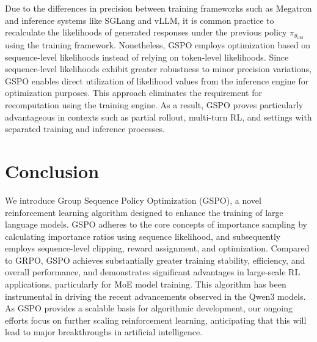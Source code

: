 Due to the differences in precision between training frameworks such as Megatron and inference systems like SGLang and vLLM, it is common practice to recalculate the likelihoods of generated responses under the previous policy $\pi_{\theta_\text{old}}$ using the training framework. Nonetheless, GSPO employs optimization based on sequence-level likelihoods instead of relying on token-level likelihoods. Since sequence-level likelihoods exhibit greater robustness to minor precision variations, GSPO enables direct utilization of likelihood values from the inference engine for optimization purposes. This approach eliminates the requirement for recomputation using the training engine. As a result, GSPO proves particularly advantageous in contexts such as partial rollout, multi-turn RL, and settings with separated training and inference processes.

\section{Conclusion}

We introduce Group Sequence Policy Optimization (GSPO), a novel reinforcement learning algorithm designed to enhance the training of large language models. GSPO adheres to the core concepts of importance sampling by calculating importance ratios using sequence likelihood, and subsequently employs sequence-level clipping, reward assignment, and optimization. Compared to GRPO, GSPO achieves substantially greater training stability, efficiency, and overall performance, and demonstrates significant advantages in large-scale RL applications, particularly for MoE model training. This algorithm has been instrumental in driving the recent advancements observed in the Qwen3 models. As GSPO provides a scalable basis for algorithmic development, our ongoing efforts focus on further scaling reinforcement learning, anticipating that this will lead to major breakthroughs in artificial intelligence.

